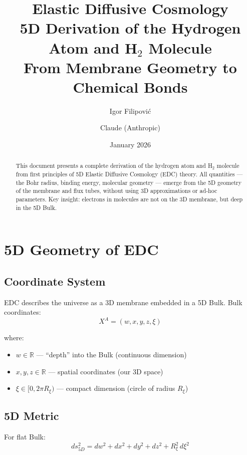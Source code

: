 \documentclass[12pt,a4paper]{article}
\title{\textbf{Elastic Diffusive Cosmology}\\[0.5cm]
\Large 5D Derivation of the Hydrogen Atom and H$_2$ Molecule\\[0.3cm]
\normalsize From Membrane Geometry to Chemical Bonds}
\author{Igor Filipovi\'{c} \and Claude (Anthropic)}
\date{January 2026}
\begin{document}
\maketitle

\begin{abstract}
This document presents a complete derivation of the hydrogen atom and H$_2$ molecule 
from first principles of 5D Elastic Diffusive Cosmology (EDC) theory. All quantities 
--- the Bohr radius, binding energy, molecular geometry --- emerge from the 5D geometry 
of the membrane and flux tubes, without using 3D approximations or ad-hoc parameters.
Key insight: electrons in molecules are not on the 3D membrane, but deep in the 5D Bulk.
\end{abstract}

\tableofcontents
\newpage

\section{5D Geometry of EDC}

\subsection{Coordinate System}

EDC describes the universe as a 3D membrane embedded in a 5D Bulk. Bulk coordinates:
\begin{equation}
X^A = (w, x, y, z, \xi)
\end{equation}

where:
\begin{itemize}
    \item $w \in \mathbb{R}$ --- ``depth'' into the Bulk (continuous dimension)
    \item $x, y, z \in \mathbb{R}$ --- spatial coordinates (our 3D space)
    \item $\xi \in [0, 2\pi R_\xi)$ --- compact dimension (circle of radius $R_\xi$)
\end{itemize}

\subsection{5D Metric}

For flat Bulk:
\begin{equation}
\boxed{ds^2_{5D} = dw^2 + dx^2 + dy^2 + dz^2 + R_\xi^2 \, d\xi^2}
\end{equation}
\end{document}
